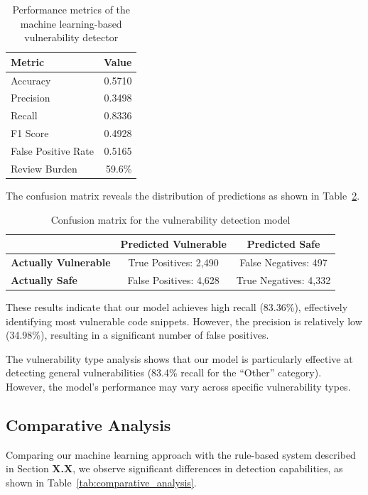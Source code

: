 \documentclass{article}
\begin{document}
\begin{table}[ht]
\centering
\begin{tabular}{lr}
\hline
\textbf{Metric} & \textbf{Value} \\
\hline
Accuracy & 0.5710 \\
Precision & 0.3498 \\
Recall & 0.8336 \\
F1 Score & 0.4928 \\
False Positive Rate & 0.5165 \\
Review Burden & 59.6\% \\
\hline
\end{tabular}
\caption{Performance metrics of the machine learning-based vulnerability detector}
\label{tab:ml_detector_performance}
\end{table}

\pagebreak

The confusion matrix reveals the distribution of predictions as shown in Table~\ref{tab:confusion_matrix}.

\begin{table}[ht]
\centering
\begin{tabular}{lcc}
\hline
& \textbf{Predicted Vulnerable} & \textbf{Predicted Safe} \\
\hline
\textbf{Actually Vulnerable} & True Positives: 2,490 & False Negatives: 497 \\
\textbf{Actually Safe} & False Positives: 4,628 & True Negatives: 4,332 \\
\hline
\end{tabular}
\caption{Confusion matrix for the vulnerability detection model}
\label{tab:confusion_matrix}
\end{table}

These results indicate that our model achieves high recall (83.36\%), effectively identifying most vulnerable code snippets. However, the precision is relatively low (34.98\%), resulting in a significant number of false positives.

The vulnerability type analysis shows that our model is particularly effective at detecting general vulnerabilities (83.4\% recall for the ``Other'' category). However, the model's performance may vary across specific vulnerability types.

\subsection{Comparative Analysis}

Comparing our machine learning approach with the rule-based system described in Section \textbf{X.X}, we observe significant differences in detection capabilities, as shown in Table~\ref{tab:comparative_analysis}.
\end{document}
